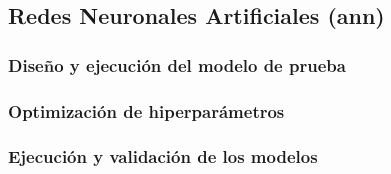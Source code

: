 \subsection{Redes Neuronales Artificiales (\acrshort{ann})}
\label{sec:ann}




\subsubsection{Diseño y ejecución del modelo de prueba}


\subsubsection{Optimización de hiperparámetros}





\subsubsection{Ejecución y validación de los modelos}














